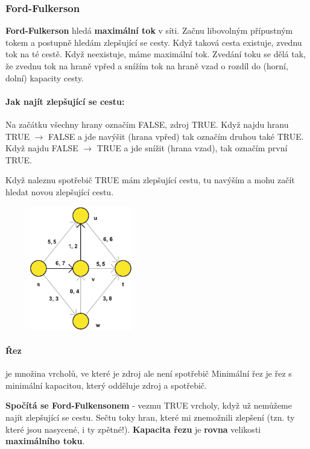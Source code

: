 \subsubsection{Ford-Fulkerson}
\textbf{Ford-Fulkerson} hledá \textbf{maximální tok} v síti. Začnu libovolným přípustným tokem a postupně hledám zlepšující se cesty. Když taková cesta existuje, zvednu tok na té cestě. Když neexistuje, máme maximální tok. Zvedání toku se dělá tak, že zvednu tok na hraně vpřed a snížím tok na hraně vzad o rozdíl do (horní, dolní) kapacity cesty.

\paragraph{Jak najít zlepšující se cestu:} Na začátku všechny hrany označím FALSE, zdroj TRUE. Když najdu hranu TRUE $\rightarrow$ FALSE a jde navýšit (hrana vpřed) tak označím druhou také TRUE. Když najdu FALSE $\rightarrow$ TRUE a jde snížit (hrana vzad), tak označím první TRUE.

Když naleznu spotřebič TRUE mám zlepšující cestu, tu navýším a mohu začít hledat novou zlepšující cestu.


\begin{figure}
  \begin{center}
    \vspace{-20px}
    \includegraphics[width=45mm]{spolecne/08/images/toky}
    \vspace{-10px}
  \end{center}
\end{figure}

\paragraph{Řez} je množina vrcholů, ve které je zdroj ale není spotřebič Minimální řez je řez s minimální kapacitou, který odděluje zdroj a spotřebič.

\textbf{Spočítá se Ford-Fulkensonem} - vezmu TRUE vrcholy, když už nemůžeme najít zlepšující se cestu. Sečtu toky hran, které mi znemožnili zlepšení (tzn. ty které jsou nasycené, i ty zpětné!). \textbf{Kapacita řezu} je \textbf{rovna} velikosti \textbf{maximálního toku}.

